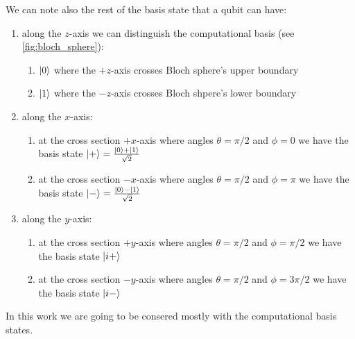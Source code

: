 We can note also the rest of the basis state that a qubit can have:

\begin{enumerate}
    \item along the $z$-axis we can distinguish the computational basis (see \ref{fig:bloch_sphere}): \begin{enumerate}
        \item $\ket{0}$ where the $+z$-axis crosses Bloch sphere's upper boundary
        \item $\ket{1}$ where the $-z$-axis crosses Bloch shpere's lower boundary
    \end{enumerate}
    \item along the $x$-axis: \begin{enumerate}
        \item at the cross section $+x$-axis where angles $\theta=\pi/2$ and $\phi=0$ we have the basis state $\ket{+}=\frac{\ket{0}+\ket{1}}{\sqrt{2}}$
        \item at the cross section $-x$-axis where angles $\theta=\pi/2$ and $\phi=\pi$ we have the basis state $\ket{-}=\frac{\ket{0}-\ket{1}}{\sqrt{2}}$
    \end{enumerate}
    \item along the $y$-axis: \begin{enumerate}
        \item at the cross section $+y$-axis where angles $\theta=\pi/2$ and $\phi=\pi/2$ we have the basis state $\ket{i+}$
        \item at the cross section $-y$-axis where angles $\theta=\pi/2$ and $\phi=3\pi/2$ we have the basis state $\ket{i-}$
    \end{enumerate}
\end{enumerate}

In this work we are going to be consered mostly with the computational basis states.